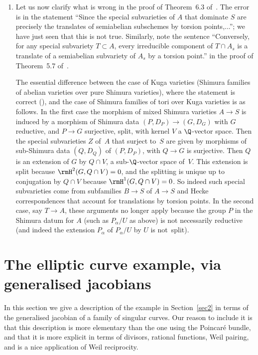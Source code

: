 \begin{Remark}
\begin{enumerate}
see~\cite{BMPZ} and~\cite{Bertrand18}.
\item\label{rem_r_f_msv_item_4} Let us now clarify what is wrong in
the proof of Theorem~6.3 of~\cite{Pink2}. The error is in the
statement ``Since the special subvarieties of $A$ that dominate $S$
are precisely the translates of semiabelian subschemes by torsion
points,...''; we have just seen that this is not true. Similarly,
note the sentence ``Conversely, for any special subvariety $T\subset
A$, every irreducible component of $T\cap A_s$ is a translate of a
semiabelian subvariety of $A_s$ by a torsion point.'' in the proof
of Theorem~5.7 of~\cite{Pink2}.\enlargethispage{\baselineskip}%

The essential difference between the case of Kuga varieties (Shimura
families of abelian varieties over pure Shimura varieties), where
the statement is correct (\hbox{\cite[Prop.\,4.6]{Pink1}}), and the
case of Shimura families of tori over Kuga varieties is as
follows. In the first case the morphism of mixed Shimura varieties
$A\to S$ is induced by a morphism of Shimura data $(P,D_P)\to
(G,D_G)$ with $G$ reductive, and $P\to G$ surjective, split, with
kernel $V$ a $\Q$-vector space. Then the special subvarieties $Z$ of~$A$ that surject to~$S$ are given by morphisms of sub-Shimura data
$(Q,D_Q)$ of $(P,D_P)$, with $Q\to G$ is surjective. Then $Q$ is an
extension of $G$ by $Q\cap V$, a sub-$\Q$-vector space of~$V$. This
extension is split because $\rmH^2(G,Q\cap V)=0$, and the splitting
is unique up to conjugation by $Q\cap V$ because $\rmH^1(G,Q\cap
V)=0$. So indeed such special subvarieties come from subfamilies
$B\to S$ of $A\to S$ and Hecke correspondences that account for
translations by torsion points. In the second case, say $T\to A$,
these arguments no longer apply because the group $P$ in the Shimura
datum for $A$ (such as $P_\alpha/U$ as above) is not necessarily
reductive (and indeed the extension $P_\alpha$ of $P_\alpha/U$ by
$U$ is not~split).
\end{enumerate}
\end{Remark}

\section{The elliptic curve example, via generalised
jacobians}\label{sec6}

In this section we give a description of the example in
Section~\ref{sec2} in terms of the generalised jacobian of a family of
singular curves. Our reason to include it is that this description is
more elementary than the one using the Poincaré bundle, and that it
is more explicit in terms of divisors, rational functions, Weil
pairing, and is a nice application of Weil reciprocity.


